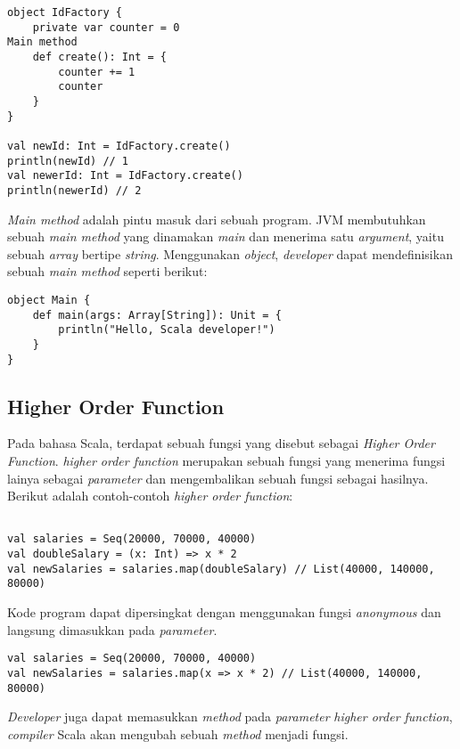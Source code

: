 \begin{verbatim}
object IdFactory {
    private var counter = 0
Main method
  	def create(): Int = {
        counter += 1
        counter
    }
}

val newId: Int = IdFactory.create()
println(newId) // 1
val newerId: Int = IdFactory.create()
println(newerId) // 2

\end{verbatim}

\textit{Main method} adalah pintu masuk dari sebuah program. JVM membutuhkan sebuah \textit{main method} yang dinamakan \textit{main} dan menerima satu \textit{argument}, yaitu sebuah \textit{array} bertipe \textit{string}. Menggunakan \textit{object}, \textit{developer} dapat mendefinisikan sebuah \textit{main method} seperti berikut: 

\begin{verbatim}
object Main {
  	def main(args: Array[String]): Unit = {
        println("Hello, Scala developer!")
    }
}
\end{verbatim}

\subsection{Higher Order Function}

Pada bahasa Scala, terdapat sebuah fungsi yang disebut sebagai \textit{Higher Order Function}. \textit{higher order function} merupakan sebuah fungsi yang menerima fungsi lainya sebagai \textit{parameter} dan mengembalikan sebuah fungsi sebagai hasilnya. Berikut adalah contoh-contoh \textit{higher order function}:

\begin{verbatim}

val salaries = Seq(20000, 70000, 40000) 
val doubleSalary = (x: Int) => x * 2
val newSalaries = salaries.map(doubleSalary) // List(40000, 140000, 80000)

\end{verbatim}

Kode program dapat dipersingkat dengan menggunakan fungsi \textit{anonymous} dan langsung dimasukkan pada \textit{parameter}.

\begin{verbatim}
val salaries = Seq(20000, 70000, 40000)
val newSalaries = salaries.map(x => x * 2) // List(40000, 140000, 80000)
\end{verbatim}

\textit{Developer} juga dapat memasukkan \textit{method} pada \textit{parameter} \textit{higher order function}, \textit{compiler} Scala akan mengubah sebuah \textit{method} menjadi fungsi.


